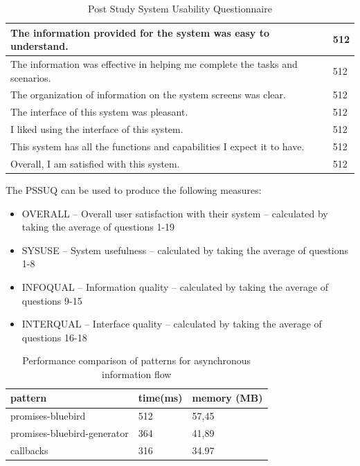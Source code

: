 \begin{table}[h]
\begin{center}
\begin{tabular}{| l | l | }
			\hline
			The information provided for the system was easy to understand. & 512  \\
			\hline
			The information was effective in helping me complete the tasks and scenarios. & 512  \\
			\hline
			The organization of information on the system screens was clear. & 512  \\
			\hline
			 The interface of this system was pleasant. & 512  \\
			\hline
			I liked using the interface of this system. & 512  \\
			\hline
			This system has all the functions and capabilities I expect it to have. & 512  \\
			\hline
			Overall, I am satisfied with this system. & 512  \\
			\hline
		\end{tabular}
	\end{center}
	\caption{Post Study System Usability Questionnaire}
\end{table}

The PSSUQ can be used to produce the following measures:
\begin{itemize}
	\item OVERALL – Overall user satisfaction with their system – calculated by taking the average of questions 1-19
	\item SYSUSE – System usefulness – calculated by taking the average of questions 1-8
	\item INFOQUAL – Information quality – calculated by taking the average of questions 9-15
	\item INTERQUAL – Interface quality – calculated by taking the average of questions 16-18
\end{itemize}
\begin{table}[h]
	\begin{center}
		\begin{tabular}{| l | l | l | }
			\hline
			\textbf{pattern} & \textbf{time(ms)} & \textbf{memory (MB)} \\
			\hline
			promises-bluebird & 512 & 57,45 \\
			\hline
			promises-bluebird-generator & 364 & 41,89 \\
			\hline
			callbacks & 316 & 34.97 \\
			\hline
		\end{tabular}
	\end{center}
	\caption{Performance comparison of patterns for asynchronous information flow \cite{asyncPerformance_2}\cite{asyncPerformance}}
\end{table}
